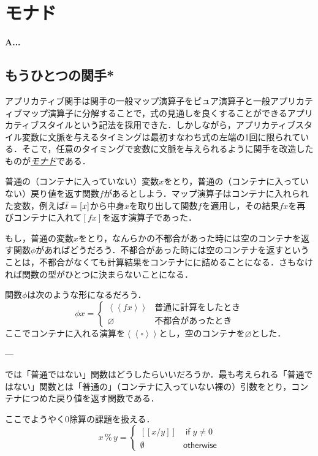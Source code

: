 \documentclass[a5paper,draft]{jsbook}
\def\[{\left[\!\left[}
\def\]{\right]\!\right]}
\newenvironment{leader}{\begingroup\bf}{\endgroup}
\newcommand{\keyword}[1]{{\underline{\emph{#1}}}}
\newcommand{\mathMaybeWith}[1]{\[#1\]}
\newcommand{\mathUnitWith}[1]{\left\langle\!\left\langle#1\right\rangle\!\right\rangle}
\newcommand{\mathListVar}[1]{\Bar{#1}}
\newcommand{\mathNothing}{\emptyset}%
\newcommand{\mathPureNothing}{\varnothing}
\newcommand{\mathSomething}{\square}
\newcommand{\mathKeyword}[1]{\operatorname{\textsf{#1}}}
\newcommand{\mathIf}{\mathKeyword{if}}
\newcommand{\mathOtherwise}{\mathKeyword{otherwise}}
\begin{document}
\chapter{モナド}

\begin{leader}
A...
\end{leader}


\section{もうひとつの関手*}


アプリカティブ関手は関手の一般マップ演算子をピュア演算子と一般アプリカティブマップ演算子に分解することで，式の見通しを良くすることができるアプリカティブスタイルという記法を採用できた．しかしながら，アプリカティブスタイル変数に文脈を与えるタイミングは最初すなわち式の左端の1回に限られている．そこで，任意のタイミングで変数に文脈を与えられるように関手を改造したものが\keyword{モナド}である．

普通の（コンテナに入っていない）変数$x$をとり，普通の（コンテナに入っていない）戻り値を返す関数$f$があるとしよう．マップ演算子はコンテナに入れられた変数，例えば$\mathListVar{t}=[x]$から中身$x$を取り出して関数$f$を適用し，その結果$fx$を再びコンテナに入れて$[fx]$を返す演算子であった．

もし，普通の変数$x$をとり，なんらかの不都合があった時には空のコンテナを返す関数$\phi$があればどうだろう．不都合があった時には空のコンテナを返すということは，不都合がなくても計算結果をコンテナにに詰めることになる．さもなければ関数の型がひとつに決まらないことになる．

関数$\phi$は次のような形になるだろう．
$$\phi x=\begin{cases}\mathUnitWith{fx}&\text{普通に計算をしたとき}\\
\mathPureNothing&\text{不都合があったとき}\end{cases}$$
ここでコンテナに入れる演算を$\mathUnitWith{\mathSomething}$とし，空のコンテナを$\mathPureNothing$とした．

---

では「普通ではない」関数はどうしたらいいだろうか．最も考えられる「普通ではない」関数とは「普通の」（コンテナに入っていない裸の）引数をとり，コンテナにつめた戻り値を返す関数である．

ここでようやく$0$除算の課題を扱える．
$$x\mathop{\%}y=\begin{cases}
\mathMaybeWith{x/y}&\mathIf y\neq0\\
\mathNothing&\mathOtherwise
\end{cases}
$$
\end{document}
